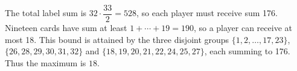 The total label sum is $32\cdot\dfrac{33}{2}=528$, so each player must receive sum 176. Nineteen cards have sum at least $1+\cdots+19=190$, so a player can receive at most 18. This bound is attained by the three disjoint groups $\{1,2,\ldots,17,23\}$, $\{26,28,29,30,31,32\}$ and $\{18,19,20,21,22,24,25,27\}$, each summing to 176. Thus the maximum is $\boxed{18}$.

